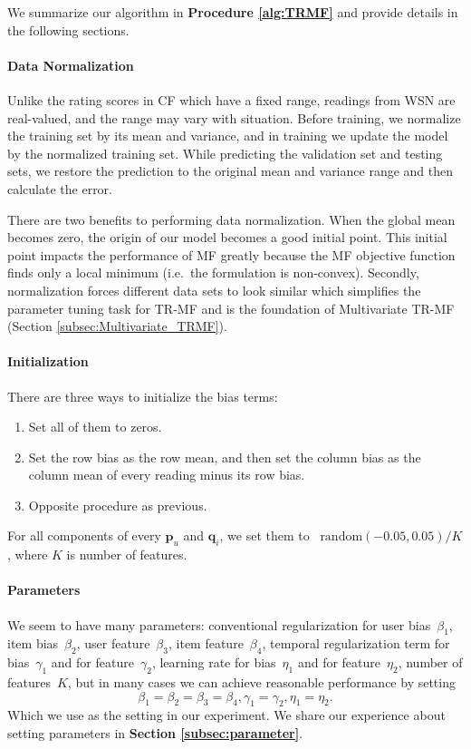 We summarize our algorithm in \textbf{Procedure \ref{alg:TRMF}} and provide details in the following sections.

\paragraph*{Data Normalization}

Unlike the rating scores in CF which have a fixed range, readings from WSN are real-valued, and the range may vary with situation.
Before training, we normalize the training set by its mean and variance, and in training we update the model by the normalized training set.
While predicting the validation set and testing sets, we restore the prediction to the original mean and variance range and then calculate the error.

There are two benefits to performing data normalization.
When the global mean becomes zero, the origin of our model becomes a good initial point.
This initial point impacts the performance of MF greatly because the MF objective function finds only a local minimum (i.e.\ the formulation is non-convex).
Secondly, normalization forces different data sets to look similar which simplifies the parameter tuning task for TR-MF and is the foundation of Multivariate TR-MF (Section \ref{subsec:Multivariate_TRMF}). 


\paragraph*{Initialization}

There are three ways to initialize the bias terms:
\begin{enumerate}
	\setlength {\itemsep}{-5pt}
	\item Set all of them to zeros.
	\item Set the row bias as the row mean, and then set the column bias as the column mean of every reading minus its row bias.
	\item Opposite procedure as previous.
\end{enumerate}
For all components of every $\mathbf{p}_{u}$ and $\mathbf{q}_{i}$, we set them to ~$\mbox{random}(-0.05,0.05)/K$, where $K$ is number of features.

\paragraph*{Parameters}

We seem to have many parameters: conventional regularization for user bias~$\beta_1$, item bias~$\beta_2$, user feature~$\beta_3$, item feature~$\beta_4$, temporal regularization term for bias~$\gamma_1$ and for feature~$\gamma_2$, learning rate for bias~$\eta_1$ and for feature~$\eta_2$, number of features~$K$, but in many cases we can achieve reasonable performance by setting 
\begin{equation*}\beta_1 = \beta_2 = \beta_3 = \beta_4, \gamma_1 = \gamma_2, \eta_1 = \eta_2. \end{equation*}
Which we use as the setting in our experiment.
We share our experience about setting parameters in \textbf{Section \ref{subsec:parameter}}.

